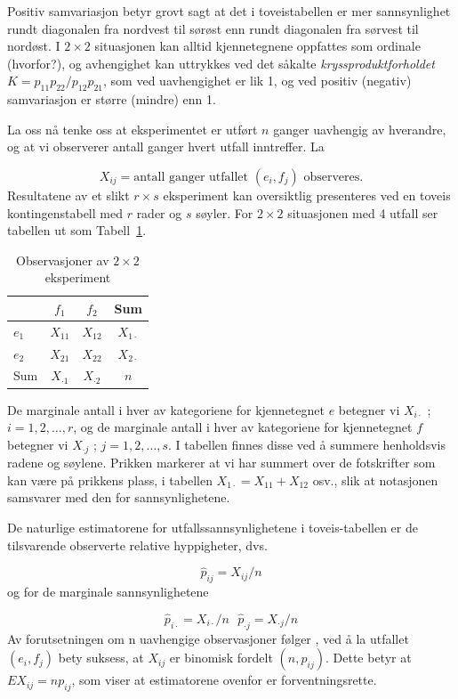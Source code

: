 Positiv samvariasjon betyr grovt sagt at det  i toveistabellen er mer
sannsynlighet rundt diagonalen fra nordvest til sørøst enn rundt
diagonalen fra sørvest til nordøst.
I $2\times 2$ situasjonen kan alltid kjennetegnene oppfattes som ordinale
(hvorfor?), og avhengighet kan uttrykkes ved det såkalte 
{\em kryssproduktforholdet} $K=p_{11}p_{22}/p_{12}p_{21}$, som ved
uavhengighet er lik 1, og ved positiv (negativ) samvariasjon er større 
(mindre)  enn 1.

La oss nå tenke oss at eksperimentet er utført $n$ ganger uavhengig av 
hverandre, og at vi observerer antall ganger hvert utfall inntreffer. La

\[ X_{ij}= \mbox{antall ganger utfallet $(e_i,f_j)$ observeres.} \]
Resultatene av et slikt $r\times s$ eksperiment kan oversiktlig
presenteres ved en toveis kontingenstabell med $r$ rader og $s$ søyler.
For $2\times 2$ situasjonen med 4 utfall ser tabellen ut som Tabell~\ref{tab:observasjoner2x2}.

\begin{table}[h] \centering 
\begin{tabular}{l|cc|c}
      &  $f_1$    &  $f_2$   &  Sum  \\ \hline
$e_1$ &  $X_{11}$ &  $X_{12}$& $X_{1\cdot}$  \\ 
$e_2$ &  $X_{21}$ &  $X_{22}$& $X_{2\cdot}$  \\  \hline
Sum   & $X_{\cdot 1}$&$X_{\cdot 2}$&   $n$  \\ \hline
\end{tabular}
\caption{Observasjoner av $2\times 2$ eksperiment}
\label{tab:observasjoner2x2} %
\end{table}

De marginale antall i hver av kategoriene for kjennetegnet $e$ betegner vi
$X_{i\cdot}$ ; $i=1,2,\ldots ,r$, og  de marginale antall i hver av
kategoriene for kjennetegnet $f$ betegner vi $X_{\cdot j}$ ; $j=1,2,\ldots ,s$.
I tabellen finnes disse ved å summere henholdsvis radene og søylene.
Prikken markerer at vi har summert over de fotskrifter som kan være på
prikkens plass, i tabellen $X_{1\cdot } = X_{11} + X_{12}$ osv., slik at
notasjonen samsvarer med den for sannsynlighetene.

De naturlige estimatorene for utfallssannsynlighetene i toveis-tabellen er de
tilsvarende observerte relative hyppigheter, dvs. 

\[ \hat{p}_{ij}=X_{ij}/n \]
og for  de marginale sannsynlighetene

\[ \hat{p}_{i\cdot}=X_{i\cdot}/n \mbox{\ \ \ \ }
                           \hat{p}_{\cdot j}=X_{\cdot j}/n \]
Av forutsetningen om n uavhengige observasjoner følger , ved å la
utfallet $(e_i,f_j)$ bety suksess, at $X_{ij}$ er
binomisk fordelt $(n,p_{ij})$. 
Dette betyr at $EX_{ij}=np_{ij}$, som viser at estimatorene ovenfor er
forventningsrette. 

